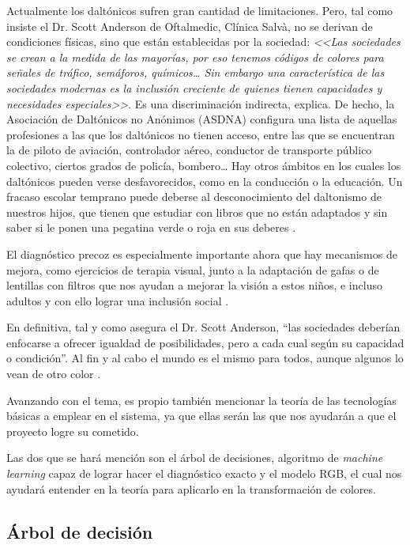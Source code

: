 \documentclass[10pt]{article}
\begin{document}
Actualmente los daltónicos sufren gran cantidad de limitaciones. Pero, tal como insiste el Dr. Scott Anderson de Oftalmedic, Clínica Salvà, no se derivan de condiciones físicas, sino que están establecidas por la sociedad: \textit{<<Las sociedades se crean a la medida de las mayorías, por eso tenemos códigos de colores para señales de tráfico, semáforos, químicos… Sin embargo una característica de las sociedades modernas es la inclusión creciente de quienes tienen capacidades y necesidades especiales>>}. Es una discriminación indirecta, explica. De hecho, la Asociación de Daltónicos no Anónimos (ASDNA) configura una lista de aquellas profesiones a las que los daltónicos no tienen acceso, entre las que se encuentran la de piloto de aviación, controlador aéreo, conductor de transporte público colectivo, ciertos grados de policía, bombero…
Hay otros ámbitos en los cuales los daltónicos pueden verse desfavorecidos, como en la conducción o la educación. Un fracaso escolar temprano puede deberse al desconocimiento del daltonismo de nuestros hijos, que tienen que estudiar con libros que no están adaptados y sin saber si le ponen una pegatina verde o roja en sus deberes \cite{IEEEreferencias:Ref33}.

El diagnóstico precoz es especialmente importante ahora que hay mecanismos de mejora, como ejercicios de terapia visual, junto a la adaptación de gafas o de lentillas con filtros que nos ayudan a mejorar la visión a estos niños, e incluso adultos y con ello lograr una inclusión social \cite{IEEEreferencias:Ref26}.

En definitiva, tal y como asegura el Dr. Scott Anderson, “las sociedades deberían enfocarse a ofrecer igualdad de posibilidades, pero a cada cual según su capacidad o condición”. Al fin y al cabo el mundo es el mismo para todos, aunque algunos lo vean de otro color \cite{IEEEreferencias:Ref33}.

Avanzando con el tema, es propio también mencionar la teoría de las tecnologías básicas a emplear en el sistema, ya que ellas serán las que nos ayudarán a que el proyecto logre su cometido.

Las dos que se hará mención son el árbol de decisiones, algoritmo de \textit{machine learning} capaz de lograr hacer el diagnóstico exacto y el modelo RGB, el cual nos ayudará entender en la teoría para aplicarlo en la transformación de colores. 


\subsection{Árbol de decisión}
\end{document}
